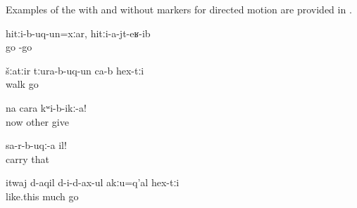 Examples of the  with and without markers for directed motion are provided in .
%
\begin{exe}
	\ex	\label{ex:Even though (the hare) run after (the turtle), it did not reach it verbs}
	\gll	hitːi-b-uq-un=xːar,	hitːi-a-jt-eʁ-ib\\
		go	-go\\
	\glt	{}

	\ex	\label{ex:They went out for a walk verbs}
	\gll	šːatːir	tːura-b-uq-un	ca-b	hex-tːi\\
		walk	go		\\
	\glt	{}

	\ex	\label{ex:Now give another (picture) verbs}
	\gll	na	cara	kʷi-b-ikː-a!\\
		now	other	give\\
	\glt	{}

	\ex	\label{ex:Take it away (from in front) verbs}
	\gll	sa-r-b-uqː-a	il!\\
		carry	that\\
	\glt	{}

	\ex	\label{ex:Otherwise not much (hay) fits inside verbs}
	\gll	itwaj	d-aqil	d-i-d-ax-ul	akːu=q'al	hex-tːi\\
		like.this	much	go		\\
	\glt	{}
\end{exe}

